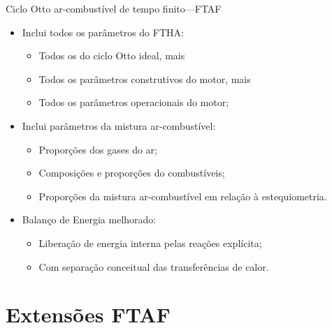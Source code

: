     \begin{frame}{Ciclo Otto ar-combustível de tempo finito---FTAF}\vspace*{-2em}
        \begin{itemize}
            \item<1->  Inclui todos os parâmetros do \alert{FTHA}:
            \begin{itemize}
                \item<2->  Todos os do \alert{ciclo Otto ideal}, mais
                \item<3->  Todos os parâmetros \alert{construtivos} do \alert{motor}, mais
                \item<4->  Todos os parâmetros \alert{operacionais} do \alert{motor};
            \end{itemize}
            \item<5->  Inclui parâmetros da \alert{mistura ar-combustível}:
            \begin{itemize}
                \item<6->  \alert{Proporções} dos gases do \alert{ar};
                \item<7->  \alert{Composições e proporções} do \alert{combustíveis};
                \item<8->  \alert{Proporções} da mistura \alert{ar-combustível} em relação à
                    \alert{estequiometria}.
            \end{itemize}
            \item<9->  \alert{Balanço de Energia} melhorado:
            \begin{itemize}
                \item<10-> \alert{Liberação de energia interna} pelas reações \alert{explícita};
                \item<11-> Com separação conceitual das \alert{transferências de calor}.
            \end{itemize}
        \end{itemize}
    \end{frame}

\section{Extensões FTAF}

